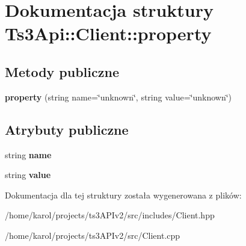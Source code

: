 \hypertarget{struct_ts3_api_1_1_client_1_1property}{}\section{Dokumentacja struktury Ts3\+Api\+:\+:Client\+:\+:property}
\label{struct_ts3_api_1_1_client_1_1property}
\subsection*{Metody publiczne}
\begin{DoxyCompactItemize}
\item 
{\bfseries property} (string name=\char`\"{}unknown\char`\"{}, string value=\char`\"{}unknown\char`\"{})\hypertarget{struct_ts3_api_1_1_client_1_1property_aef64d7ac764467bf935e249f84b4ae5c}{}\label{struct_ts3_api_1_1_client_1_1property_aef64d7ac764467bf935e249f84b4ae5c}

\end{DoxyCompactItemize}
\subsection*{Atrybuty publiczne}
\begin{DoxyCompactItemize}
\item 
string {\bfseries name}\hypertarget{struct_ts3_api_1_1_client_1_1property_a98abf2edc5d0b5aef0e3ee8728b3adca}{}\label{struct_ts3_api_1_1_client_1_1property_a98abf2edc5d0b5aef0e3ee8728b3adca}

\item 
string {\bfseries value}\hypertarget{struct_ts3_api_1_1_client_1_1property_a97c5785692250279b6ed4cf6775b20d9}{}\label{struct_ts3_api_1_1_client_1_1property_a97c5785692250279b6ed4cf6775b20d9}

\end{DoxyCompactItemize}


Dokumentacja dla tej struktury została wygenerowana z plików\+:\begin{DoxyCompactItemize}
\item 
/home/karol/projects/ts3\+A\+P\+Iv2/src/includes/Client.\+hpp\item 
/home/karol/projects/ts3\+A\+P\+Iv2/src/Client.\+cpp\end{DoxyCompactItemize}
